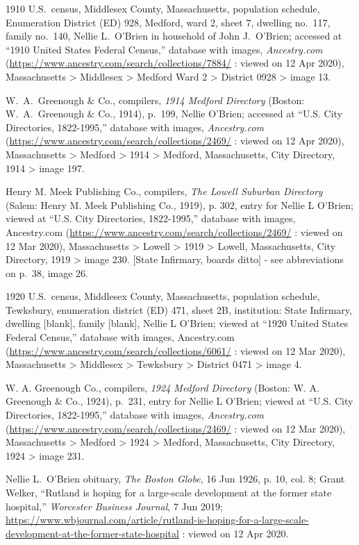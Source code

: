 \begin{thebibliography}{999}
1910 U.S.\ census, Middlesex County, Massachusetts, population schedule, Enumeration District (ED) 928, Medford, ward 2, sheet 7, dwelling no.\ 117, family no.\ 140, Nellie L.\ O'Brien in household of John J.\ O'Brien; accessed at ``1910 United States Federal Census,'' database with images, \textit{Ancestry.com} (\url{https://www.ancestry.com/search/collections/7884/} : viewed on 12 Apr 2020), Massachusetts > Middlesex > Medford Ward 2 > District 0928 > image 13.

W.\ A.\ Greenough \& Co., compilers, \textit{1914 Medford Directory} (Boston: W.\ A.\ Greenough \& Co., 1914), p.\ 199, Nellie O'Brien; accessed at ``U.S. City Directories, 1822-1995,'' database with images, \textit{Ancestry.com} (\url{https://www.ancestry.com/search/collections/2469/} : viewed on 12 Apr 2020), Massachusetts > Medford > 1914 > Medford, Massachusetts, City Directory, 1914 > image 197. 

Henry M. Meek Publishing Co., compilers, \textit{The Lowell Suburban Directory} (Salem: Henry M. Meek Publishing Co., 1919), p. 302, entry for Nellie L O'Brien; viewed at ``U.S. City Directories, 1822-1995,'' database with images, Ancestry.com (\url{https://www.ancestry.com/search/collections/2469/} : viewed on 12 Mar 2020), Massachusetts > Lowell > 1919 > Lowell, Massachusetts, City Directory, 1919 > image 230. 
[State Infirmary, boards ditto] - see abbreviations on p.\ 38, image 26.

1920 U.S.\ census, Middlesex County, Massachusetts, population schedule, Tewksbury, enumeration district (ED) 471, sheet 2B, institution: State Infirmary, dwelling [blank], family [blank], Nellie L O'Brien; viewed at ``1920 United States Federal Census,'' database with images, Ancestry.com (\url{https://www.ancestry.com/search/collections/6061/} : viewed on 12 Mar 2020), Massachusetts > Middlesex > Tewksbury > District 0471 > image 4.

W. A. Greenough Co., compilers, \textit{1924 Medford Directory} (Boston: W. A. Greenough \& Co., 1924), p.\ 231, entry for Nellie L O'Brien; viewed at ``U.S. City Directories, 1822-1995,'' database with images, \textit{Ancestry.com} (\url{https://www.ancestry.com/search/collections/2469/} : viewed on 12 Mar 2020), Massachusetts > Medford > 1924 > Medford, Massachusetts, City Directory, 1924 > image 231.

Nellie L.\ O’Brien obituary, \textit{The Boston Globe}, 16 Jun 1926, p. 10, col. 8; Grant Welker, ``Rutland is hoping for a large-scale development at the former state hospital,'' \textit{Worcester Business Journal}, 7 Jun 2019;  \url{https://www.wbjournal.com/article/rutland-is-hoping-for-a-large-scale-development-at-the-former-state-hospital} : viewed on 12 Apr 2020.


\end{thebibliography}
